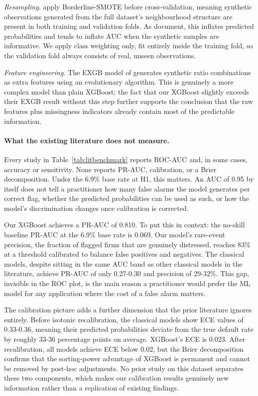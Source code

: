 \documentclass[12pt,a4paper]{article}
\begin{document}
\emph{Resampling.} \cite{smiti2020} apply Borderline-SMOTE before
cross-validation, meaning synthetic observations generated from the full
dataset's neighbourhood structure are present in both training and validation
folds. As \cite{king2001} document, this inflates predicted probabilities and
tends to inflate AUC when the synthetic samples are informative. We apply class
weighting only, fit entirely inside the training fold, so the validation fold
always consists of real, unseen observations.

\emph{Feature engineering.} The EXGB model of \cite{zieba2016} generates
synthetic ratio combinations as extra features using an evolutionary algorithm.
This is genuinely a more complex model than plain XGBoost; the fact that our
XGBoost slightly exceeds their EXGB result without this step further supports
the conclusion that the raw features plus missingness indicators already contain
most of the predictable information.

\paragraph{What the existing literature does not measure.}

Every study in Table~\ref{tab:litbenchmark} reports ROC-AUC and, in some cases,
accuracy or sensitivity. None reports PR-AUC, calibration, or a Brier
decomposition. Under the 6.9\% base rate at H1, this matters. An AUC of 0.95
by itself does not tell a practitioner how many false alarms the model generates
per correct flag, whether the predicted probabilities can be used as such, or
how the model's discrimination changes once calibration is corrected.

Our XGBoost achieves a PR-AUC of 0.810. To put this in context: the no-skill
baseline PR-AUC at the 6.9\% base rate is 0.069. Our model's rare-event
precision, the fraction of flagged firms that are genuinely distressed, reaches
83\% at a threshold calibrated to balance false positives and negatives. The
classical models, despite sitting in the same AUC band as other classical models
in the literature, achieve PR-AUC of only 0.27-0.30 and precision of 29-32\%.
This gap, invisible in the ROC plot, is the main reason a practitioner would
prefer the ML model for any application where the cost of a false alarm matters.

The calibration picture adds a further dimension that the prior literature
ignores entirely. Before isotonic recalibration, the classical models show ECE
values of 0.33-0.36, meaning their predicted probabilities deviate from the true
default rate by roughly 33-36 percentage points on average. XGBoost's ECE is
0.023. After recalibration, all models achieve ECE below 0.02, but the Brier
decomposition confirms that the sorting-power advantage of XGBoost is permanent
and cannot be removed by post-hoc adjustments. No prior study on this dataset
separates these two components, which makes our calibration results genuinely
new information rather than a replication of existing findings.
\end{document}

